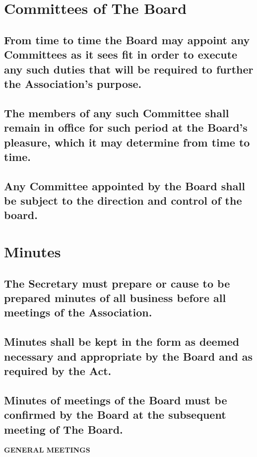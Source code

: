 \documentclass{article}
\newenvironment{subs}
  {\adjustwidth{2em}{0pt}}
  {\endadjustwidth}
\begin{document}
\section{Committees of The Board}
\begin{subs}
\subsection{From time to time the Board may appoint any Committees as it sees fit in order to execute any such duties that will be required to further the Association's purpose.}
\subsection{The members of any such Committee shall remain in office for such period at the Board's pleasure, which it may determine from time to time.}
\subsection{Any Committee appointed by the Board shall be subject to the direction and control of the board.}
\end{subs}

\section{Minutes}
\begin{subs}
\subsection{The Secretary must prepare or cause to be prepared minutes of all business before all meetings of the Association.}
\subsection{Minutes shall be kept in the form as deemed necessary and appropriate by the Board and as required by the Act.}
\subsection{Minutes of meetings of the Board must be confirmed by the Board at the subsequent meeting of The Board.}
\end{subs}

\vspace{5mm}
{\large\bf GENERAL MEETINGS\par}
\hrulefill
\vspace{5mm}
\end{document}
